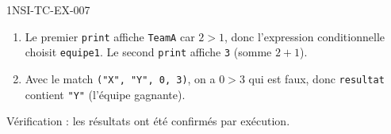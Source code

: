 \begin{corrige}{1NSI-TC-EX-007}
\begin{enumerate}
  \item Le premier \lstinline{print} affiche \lstinline{TeamA} car $2 > 1$, donc l'expression conditionnelle choisit \lstinline{equipe1}. Le second \lstinline{print} affiche \lstinline{3} (somme $2 + 1$).

  \item Avec le match \lstinline{("X", "Y", 0, 3)}, on a $0 > 3$ qui est faux, donc \lstinline{resultat} contient \lstinline{"Y"} (l'équipe gagnante).
\end{enumerate}

Vérification : les résultats ont été confirmés par exécution.
\end{corrige}

%
%
